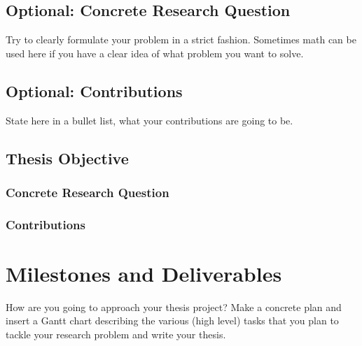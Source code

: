 \documentclass[a4paper]{article}
\begin{document}
\subsection*{Optional: Concrete Research Question}
Try to clearly formulate your problem in a strict fashion. Sometimes math can be used here if you have a clear idea of what problem you want to solve. 


\subsection*{Optional: Contributions}
State here in a bullet list, what your contributions are going to be. 

\subsection{Thesis Objective}

\subsubsection{Concrete Research Question}

\subsubsection{Contributions}



\section{Milestones and Deliverables}
How are you going to approach your thesis project? Make a concrete plan and insert a Gantt chart describing the various (high level) tasks that you plan to tackle your research problem and write your thesis. 


\printbibliography
\end{document}
